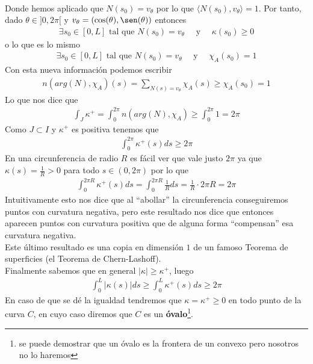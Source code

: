 \begin{ejemplo}
\begin{gather*}
    \end{gather*}
    Donde hemos aplicado que $N(s_0) = v_\theta$ por lo que $\langle N(s_0), v_\theta\rangle = 1$. Por tanto, dado $\theta\in]0,2\pi[$ y $v_\theta=(\cos(\theta), \sen(\theta))$ entonces 
    \begin{gather*}
        \exists s_0\in[0,L] \text{ tal que } N(s_0) = v_\theta \quad \text{ y } \quad \kappa(s_0)\geq 0
    \end{gather*}
    o lo que es lo mismo
    \begin{gather*}
        \exists s_0\in[0,L] \text{ tal que } N(s_0) = v_\theta \quad \text{ y } \quad \chi_A(s_0)=1
    \end{gather*}
    Con esta nueva información podemos escribir
    \begin{gather*}
        n(arg(N), \chi_A)(s) = \sum_{N(s)=v_\theta} \chi_A(s) \geq \chi_A(s_0) = 1
    \end{gather*}
    Lo que nos dice que 
    \begin{gather*}
        \int_J \kappa^+ = \int_0^{2\pi} n(arg(N), \chi_A) \geq \int_0^{2\pi} 1 = 2\pi
    \end{gather*}
    Como $J\subset I$ y $\kappa^+$ es positiva tenemos que 
    \begin{gather*}
        \boxed{\int_0^{2\pi} \kappa^+(s) ds \geq 2\pi}
    \end{gather*}
    En una circunferencia de radio $R$ es fácil ver que vale justo $2\pi$ ya que $\kappa(s)=\frac{1}{R}>0$ para todo $s\in (0,2\pi)$ por lo que
    \begin{gather*}
        \int_0^{2\pi R} \kappa^+(s)ds = \int_0^{2\pi R} \frac{1}{R} ds = \frac{1}{R}\cdot 2\pi R = 2\pi
    \end{gather*}
    Intuitivamente esto nos dice que al ``abollar'' la circunferencia conseguiremos puntos con curvatura negativa, pero este resultado nos dice que entonces aparecen puntos con curvatura positiva que de alguna forma ``compensan'' esa curvatura negativa.\\

    Este último resultado es una copia en dimensión $1$ de un famoso Teorema de superficies (el Teorema de Chern-Lashoff).\\

    Finalmente sabemos que en general $|\kappa| \geq \kappa^+$, luego
    \begin{gather*}
        \int_0^L |\kappa(s)| ds \geq \int_0^L \kappa^+(s) ds \geq 2\pi
    \end{gather*}
    En caso de que se dé la igualdad tendremos que $\kappa = \kappa^+ \geq 0$ en todo punto de la curva $C$, en cuyo caso diremos que $C$ es un \textbf{óvalo}\footnote{se puede demostrar que un óvalo es la frontera de un convexo pero nosotros no lo haremos}.
\end{ejemplo}

